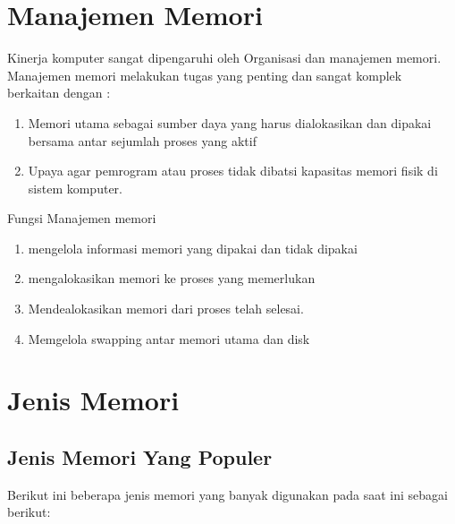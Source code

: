 \section{Manajemen Memori}
\par
Kinerja komputer sangat dipengaruhi oleh Organisasi dan manajemen memori.
Manajemen memori melakukan tugas yang penting dan sangat komplek berkaitan dengan :
\begin{enumerate}
\item Memori utama sebagai sumber daya yang harus dialokasikan dan dipakai bersama antar sejumlah proses yang aktif
\item Upaya agar pemrogram atau proses tidak dibatsi kapasitas memori fisik di sistem komputer.
\end{enumerate}

Fungsi Manajemen memori 
\begin{enumerate}
\item mengelola informasi memori yang dipakai dan tidak dipakai
\item mengalokasikan memori ke proses yang memerlukan
\item Mendealokasikan memori dari proses telah selesai.
\item Memgelola swapping antar memori utama dan disk
\end{enumerate}

\section{Jenis Memori}
\subsection{Jenis Memori Yang Populer}

Berikut ini beberapa jenis memori yang banyak digunakan pada saat ini sebagai berikut:

